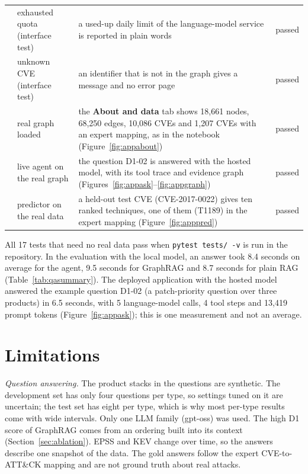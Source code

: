 \documentclass[12pt, a4paper]{article}
\newcommand{\ATTCK}{ATT\&CK}
\begin{document}
\begin{table}[H]
\begin{tabularx}{\textwidth}{>{\raggedright\arraybackslash}p{0.7cm}>{\raggedright\arraybackslash}p{4.6cm}>{\raggedright\arraybackslash}X>{\raggedright\arraybackslash}p{1.4cm}}
16 & exhausted quota (interface test) & a used-up daily limit of the language-model service is reported in plain words & passed \\
17 & unknown CVE (interface test) & an identifier that is not in the graph gives a message and no error page & passed \\
18 & real graph loaded & the \textbf{About and data} tab shows 18,661 nodes, 68,250 edges, 10,086 CVEs and 1,207 CVEs with an expert mapping, as in the notebook (Figure~\ref{fig:appabout}) & passed \\
19 & live agent on the real graph & the question D1-02 is answered with the hosted model, with its tool trace and evidence graph (Figures~\ref{fig:appask}--\ref{fig:appgraph}) & passed \\
20 & predictor on the real data & a held-out test CVE (CVE-2017-0022) gives ten ranked techniques, one of them (T1189) in the expert mapping (Figure~\ref{fig:apppred}) & passed \\ \bottomrule
\end{tabularx}
\end{table}
All 17 tests that need no real data pass when \texttt{pytest tests/ -v} is run in the repository. In the evaluation with the local model, an answer took 8.4 seconds on average for the agent, 9.5 seconds for GraphRAG and 8.7 seconds for plain RAG (Table~\ref{tab:qasummary}). The deployed application with the hosted model answered the example question D1-02 (a patch-priority question over three products) in 6.5 seconds, with 5 language-model calls, 4 tool steps and 13,419 prompt tokens (Figure~\ref{fig:appask}); this is one measurement and not an average.

\section{Limitations}
\emph{Question answering.} The product stacks in the questions are synthetic. The development set has only four questions per type, so settings tuned on it are uncertain; the test set has eight per type, which is why most per-type results come with wide intervals. Only one LLM family (gpt-oss) was used. The high D1 score of GraphRAG comes from an ordering built into its context (Section~\ref{sec:ablation}). EPSS and KEV change over time, so the answers describe one snapshot of the data. The gold answers follow the expert CVE-to-\ATTCK{} mapping and are not ground truth about real attacks.
\end{document}
